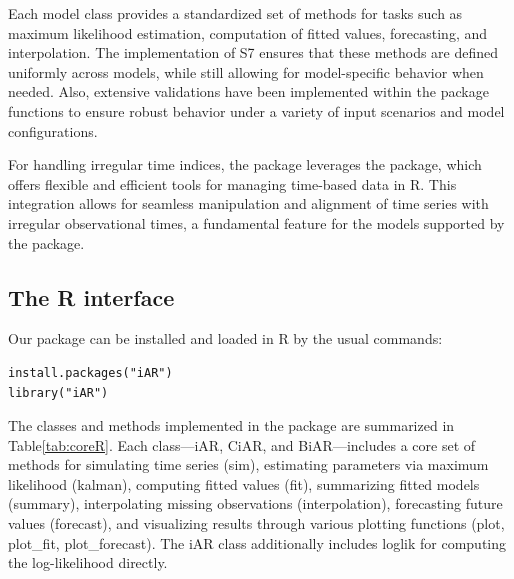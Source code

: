 Each model class provides a standardized set of methods for tasks such as maximum likelihood estimation, computation of fitted values, forecasting, and interpolation. The implementation of S7 ensures that these methods are defined uniformly across models, while still allowing for model-specific behavior when needed. Also, extensive validations have been implemented within the package functions to ensure robust behavior under a variety of input scenarios and model configurations.

For handling irregular time indices, the package leverages the  package, which offers flexible and efficient tools for managing time-based data in R. This integration allows for seamless manipulation and alignment of time series with irregular observational times, a fundamental feature for the models supported by the package.

\subsection{The R interface}\label{the-r-interface}

Our package can be installed and loaded in R by the usual commands:

\begin{verbatim}
install.packages("iAR")
library("iAR")
\end{verbatim}

The classes and methods implemented in the  package are summarized in Table\ref{tab:coreR}. Each class---iAR, CiAR, and BiAR---includes a core set of methods for simulating time series (sim), estimating parameters via maximum likelihood (kalman), computing fitted values (fit), summarizing fitted models (summary), interpolating missing observations (interpolation), forecasting future values (forecast), and visualizing results through various plotting functions (plot, plot\_fit, plot\_forecast). The iAR class additionally includes loglik for computing the log-likelihood directly.

